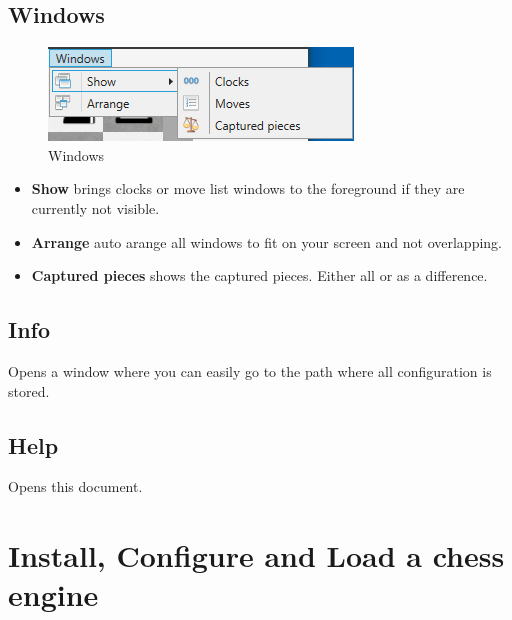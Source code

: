 \documentclass[11pt,a4paper]{article}
\begin{document}
\subsection{Windows}
\begin{figure}[H]
	\centering
	\includegraphics[scale=1.0]{Windows.png}
	\caption{Windows}
	\label{fig:Windows}
\end{figure}
\begin{itemize}
	\item \textbf{Show} brings clocks or move list windows to the foreground if they are currently not visible.
	\item \textbf{Arrange} auto arange all windows to fit on your screen and not overlapping.
	\item \textbf{Captured pieces} shows the captured pieces. Either all or as a difference. 
\end{itemize}

\subsection{Info}
Opens a window where you can easily go to the path where all configuration is stored.

\subsection{Help}
Opens this document.

\section{Install, Configure and Load a chess engine} \label{loadEngines}
\end{document}
